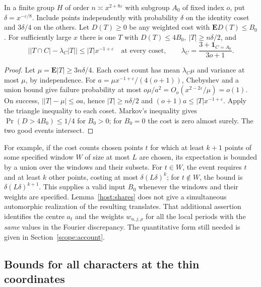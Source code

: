 \begin{lemma}\label{host:shares}
In a finite group \(H\) of order \(n\asymp x^{2+8\varepsilon}\) with
subgroup \(A_0\) of fixed index \(o\), put \(\delta=x^{-\varepsilon/8}\).
Include points independently with probability \(\delta\) on the identity
coset and \(3\delta/4\) on the others. Let \(D(T)\ge0\) be any weighted
cost with \(\mathbf E D(T)\le B_0\). For sufficiently large \(x\) there is
one \(T\) with \(D(T)\le4 B_0,\ |T|\ge n\delta/2\), and
\[
  \big||T\cap C|-\lambda_C|T|\big|\le |T|x^{-1+\varepsilon}
  \quad\text{at every coset},\qquad
  \lambda_C=\frac{3+\mathbf1_{C=A_0}}{3o+1}.
\]
\end{lemma}
\begin{proof}
Let \(\mu=\mathbf E|T|\ge3n\delta/4\). Each coset count has mean
\(\lambda_C\mu\) and variance at most \(\mu\), by independence. For
\(a=\mu x^{-1+\varepsilon}/(4(o+1))\), Chebyshev and a union bound
give failure probability at most \(o\mu/a^2=O_o(x^{2-2\varepsilon}/\mu)
=o(1)\). On success, \(\big||T|-\mu\big|\le oa\), hence
\(|T|\ge n\delta/2\) and \((o+1)a\le |T|x^{-1+\varepsilon}\).
Apply the triangle inequality to each coset. Markov's inequality gives
\(\Pr(D>4B_0)\le1/4\) for \(B_0>0\); for \(B_0=0\) the cost is zero
almost surely. The two good events intersect.
\end{proof}

For example, if the cost counts chosen points \(t\) for which at least
\(k+1\) points of some specified window \(W\) of size at most \(L\) are
chosen, its expectation is bounded by a union over the windows and their
subsets. For \(t\in W\), the event requires \(t\) and at least \(k\)
other points, costing at most \(\delta(L\delta)^k\); for \(t\notin W\),
the bound is \(\delta(L\delta)^{k+1}\). This supplies a valid input
\(B_0\) whenever the windows and their weights are specified.
Lemma~\ref{host:shares} does not give a simultaneous automorphic realization
of the resulting translates. That additional assertion identifies the
centre \(a_t\) and the weights \(w_{u,j,\rho}\) for all the local periods
with the \emph{same} values in the Fourier discrepancy. The quantitative
form still needed is given in Section~\ref{scope:account}.

\subsection{Bounds for all characters at the thin coordinates}

